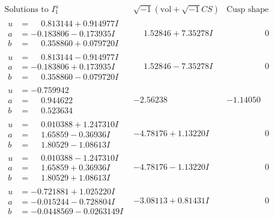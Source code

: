 \documentclass[1p]{elsarticle_modified}
\theoremstyle{definition}
\newcommand{\I}{\sqrt{-1}}
\begin{document}
$$\begin{array}{c|c|c}
\text{Solutions to }I^u_{1}& \I (\text{vol} + \sqrt{-1}CS) & \text{Cusp shape}\\
 \hline 
\begin{aligned}
u &= \phantom{-}0.813144 + 0.914977 I \\
a &= -0.183806 - 0.173935 I \\
b &= \phantom{-}0.358860 + 0.079720 I\end{aligned}
 & \phantom{-}1.52846 + 7.35278 I & \phantom{-0.000000 } 0 \\ \hline\begin{aligned}
u &= \phantom{-}0.813144 - 0.914977 I \\
a &= -0.183806 + 0.173935 I \\
b &= \phantom{-}0.358860 - 0.079720 I\end{aligned}
 & \phantom{-}1.52846 - 7.35278 I & \phantom{-0.000000 } 0 \\ \hline\begin{aligned}
u &= -0.759942\phantom{ +0.000000I} \\
a &= \phantom{-}0.944622\phantom{ +0.000000I} \\
b &= \phantom{-}0.523634\phantom{ +0.000000I}\end{aligned}
 & -2.56238\phantom{ +0.000000I} & -1.14050\phantom{ +0.000000I} \\ \hline\begin{aligned}
u &= \phantom{-}0.010388 + 1.247310 I \\
a &= \phantom{-}1.65859 - 0.36936 I \\
b &= \phantom{-}1.80529 - 1.08613 I\end{aligned}
 & -4.78176 + 1.13220 I & \phantom{-0.000000 } 0 \\ \hline\begin{aligned}
u &= \phantom{-}0.010388 - 1.247310 I \\
a &= \phantom{-}1.65859 + 0.36936 I \\
b &= \phantom{-}1.80529 + 1.08613 I\end{aligned}
 & -4.78176 - 1.13220 I & \phantom{-0.000000 } 0 \\ \hline\begin{aligned}
u &= -0.721881 + 1.025220 I \\
a &= -0.015244 - 0.728804 I \\
b &= -0.0448569 - 0.0263149 I\end{aligned}
 & -3.08113 + 0.81431 I & \phantom{-0.000000 } 0 \\ \hline\begin{aligned}

\end{aligned}
\end{array}$$
\end{document}

